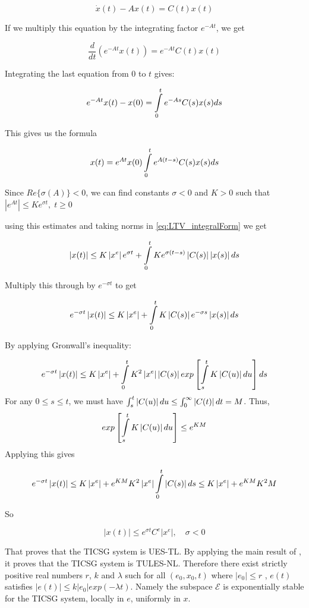 \documentclass[letterpaper, 10 pt, conference]{ieeeconf}  %
\begin{document}
\[
\dot{x}(t)-Ax(t)=C(t)x(t)
\]

If we multiply this equation by the integrating factor
$e^{-At}$, we get 

\[
\frac{d}{dt}\left(e^{-At}x(t)\right)=e^{-At}C(t)x(t)
\]

Integrating the last equation from $0$ to $t$ gives:

\[
e^{-At}x(t)-x(0)=\intop_{0}^{t}e^{-As}C(s)x(s)ds
\]

This gives us the formula

\begin{equation}
x(t)=e^{At}x(0)\intop_{0}^{t}e^{A(t-s)}C(s)x(s)ds\label{eq:LTV_integralForm}
\end{equation}

Since $Re\{\sigma(A)\}<0$, we can find constants $\sigma<0$ and
$K>0$ such that $\left|e^{At}\right|\leq Ke^{\sigma t},\;t\geq0$ 

using this estimates and taking norms in \eqref{eq:LTV_integralForm}
we get 

\[
\left|x(t)\right|\leq K\left|x^{e}\right|e^{\sigma t}+\intop_{0}^{t}Ke^{\sigma(t-s)}\left|C(s)\right|\left|x(s)\right|ds
\]

Multiply this through by $e^{-\sigma t}$ to get

\[
e^{-\sigma t}\left|x(t)\right|\leq K\left|x^{e}\right|+\intop_{0}^{t}K\left|C(s)\right|e^{-\sigma s}\left|x(s)\right|ds
\]

By applying Gronwall's inequality:

\[
e^{-\sigma t}\left|x(t)\right|\leq K\left|x^{e}\right|+\intop_{0}^{t}K^{2}\left|x^{e}\right|\left|C(s)\right|exp\left[\intop_{s}^{t}K\left|C(u)\right|du\right]ds
\]
For any $0\le s\le t$, we must have $\intop_{s}^{t}\left|C(u)\right|du\le\intop_{0}^{\infty}\left|C(t)\right|dt=M$.
Thus, 
\[
exp\left[\intop_{s}^{t}K\left|C(u)\right|du\right]\le e^{KM}
\]
Applying this gives

\[
e^{-\sigma t}\left|x(t)\right|\leq K\left|x^{e}\right|+e^{KM}K^{2}\left|x^{e}\right|\intop_{0}^{t}\left|C(s)\right|ds\le K\left|x^{e}\right|+e^{KM}K^{2}M
\]

So 

\[
\left|x(t)\right|\leq e^{\sigma t}C^{e}\left|x^{e}\right|,\quad\sigma<0
\]

That proves that the TICSG system is UES-TL. By applying
the main result of \cite{AndrieuJayawardhanaPraly}, it proves that the TICSG system is TULES-NL.
Therefore there exist strictly positive real numbers $r$, $k$
and $\lambda$ such for all $(e_0,x_0,t)$ where $\left| e_0 \right| \le r $
, $e(t)$ satisfies $\left|e(t)\right|\leq k\left|e_0 \right|exp(-\lambda t)$.
Namely the subspace $\mathscr{E}$ is exponentially stable for the TICSG system, locally in $e$, uniformly in $x$.
\end{document}
